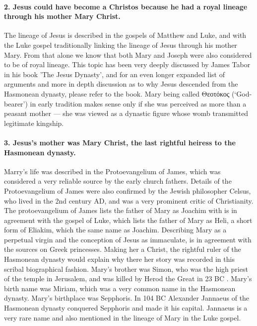 \paragraph{2.
Jesus could have become a Christos because he had a royal lineage through his mother Mary Christ.}\label{par:jesus-could-have-become-a-christos-because-he-had-a-royal-lineage-through-his-mother-mary-christ.}

The lineage of Jesus is described in the gospels of Matthew and Luke, and with the Luke gospel traditionally linking the lineage of Jesus through his mother Mary.
From that alone we know that both Mary and Joseph were also considered to be of royal lineage.
This topic has been very deeply discussed by James Tabor in his book 'The Jesus Dynasty', and for an even longer expanded list of arguments and more in depth discussion as to why Jesus descended from the Hasmonean dynasty, please refer to the book.
Mary being called Θεοτόκος (‘God-bearer’) in early tradition makes sense only if she was perceived as more than a peasant mother — she was viewed as a dynastic figure whose womb transmitted legitimate kingship.

\paragraph{3.
Jesus's mother was Mary Christ, the last rightful heiress to the Hasmonean dynasty.}\label{par:jesuss-mother-was-mary-christ-the-last-rightful-heiress-to-the-hasmonean-dynasty.}

Marry's life was described in the Protoevangelium of James, which was considered a very reliable source by the early church fathers.
Details of the Protoevangelium of James were also confirmed by the Jewish philosopher Celsus, who lived in the 2nd century AD, and was a very prominent critic of Christianity.
The protoevangelium of James lists the father of Mary as Joachim with is in agreement with the gospel of Luke, which lists the father of Mary as Heli, a short form of Eliakim, which the same name as Joachim.
Describing Mary as a perpetual virgin and the conception of Jesus as immaculate, is in agreement with the sources on Greek princesses.
Making her a Christ, the rightful ruler of the Hasmonean dynasty would explain why there her story was recorded in this scribal biographical fashion.
Mary's brother was Simon, who was the high priest of the temple in Jerusalem, and was killed by Herod the Great in 23 BC .
Mary's birth name was Miriam, which was a very common name in the Hasmonean dynasty.
Mary's birthplace was Sepphoris.
In 104 BC Alexander Jannaeus of the Hasmonean dynasty conquered Sepphoris and made it his capital.
Jannaeus is a very rare name and also mentioned in the lineage of Mary in the Luke gospel.

